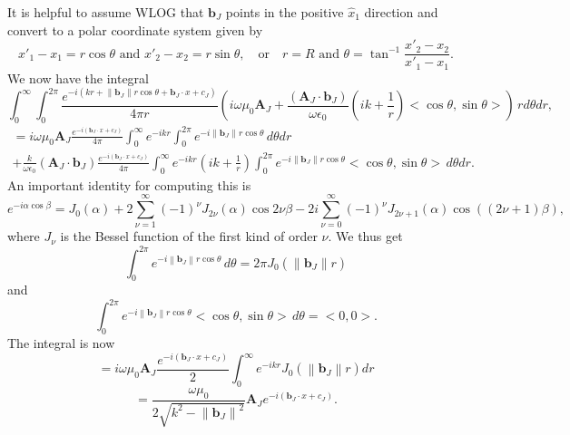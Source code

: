 \documentclass{article}
\newcommand{\norm}[1]{\left\lVert #1 \right\rVert}
\theoremstyle{plain}
\begin{document}
It is helpful to assume WLOG that $\mathbf{b}_J$ points in the positive $\hat{x}_1$ direction and convert to a polar coordinate system given by
\begin{equation}
	x'_1-x_1 = r\cos{\theta} \text{ and } x'_2-x_2 = r\sin{\theta}, \quad\text{or}\quad r = R \text{ and } \theta = \tan^{-1}{\frac{x'_2 - x_2}{x'_1 - x_1}}.
\end{equation}
We now have the integral
\begin{equation}
	\int_0^\infty \int_0^{2\pi} \frac{e^{-i(kr+\norm{\mathbf{b}_J}r\cos{\theta} + \mathbf{b}_J\cdot x + c_J)}}{4\pi r}
	\left( i\omega\mu_0 \mathbf{A}_J
	+ \frac{(\mathbf{A}_J\cdot\mathbf{b}_J)}{\omega\epsilon_0}\left( ik + \frac{1}{r} \right) <\cos{\theta},\sin{\theta}> \right) \,rd\theta dr,
\end{equation}
\begin{multline}
	=i\omega\mu_0 \mathbf{A}_J\frac{e^{-i(\mathbf{b}_J\cdot x + c_J)}}{4\pi}
	\int_0^\infty e^{-ikr} \int_0^{2\pi} e^{-i\norm{\mathbf{b}_J}r\cos{\theta}} \,d\theta dr \\
	+ \frac{k}{\omega\epsilon_0}(\mathbf{A}_J\cdot\mathbf{b}_J)\frac{e^{-i(\mathbf{b}_J\cdot x + c_J)}}{4\pi}
	\int_0^\infty e^{-ikr}\left( ik + \frac{1}{r} \right) \int_0^{2\pi} e^{-i\norm{\mathbf{b}_J}r\cos{\theta}} <\cos{\theta},\sin{\theta}> \,d\theta dr.
\end{multline}
An important identity for computing this is
\begin{equation}
	e^{-i\alpha\cos{\beta}}
	= J_0(\alpha) + 2\sum_{\nu=1}^\infty (-1)^\nu J_{2\nu}(\alpha)\cos{2\nu\beta} 
	- 2i\sum_{\nu=0}^\infty (-1)^\nu J_{2\nu+1}(\alpha)\cos{\left((2\nu+1)\beta\right)},
\end{equation}
where $J_\nu$ is the Bessel function of the first kind of order $\nu$.
We thus get
\begin{equation}
	\int_0^{2\pi} e^{-i\norm{\mathbf{b}_J}r\cos{\theta}} \,d\theta = 2\pi J_0(\norm{\mathbf{b}_J}r)
\end{equation}
and
\begin{equation}
	\int_0^{2\pi} e^{-i\norm{\mathbf{b}_J}r\cos{\theta}} <\cos{\theta},\sin{\theta}> \,d\theta = <0,0>.
\end{equation}
The integral is now
\begin{equation}
	=i\omega\mu_0 \mathbf{A}_J\frac{e^{-i(\mathbf{b}_J\cdot x + c_J)}}{2}
	\int_0^\infty e^{-ikr} J_0(\norm{\mathbf{b}_J}r) dr
\end{equation}
\begin{equation}
	= \frac{\omega\mu_0}{2\sqrt{k^2 - \norm{\mathbf{b}_J}^2}} \mathbf{A}_J e^{-i(\mathbf{b}_J\cdot x + c_J)}.
\end{equation}
\end{document}
